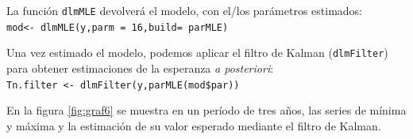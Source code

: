 \documentclass[12pt]{article}\usepackage[]{graphicx}\usepackage[]{color}
\begin{document}
La función \verb|dlmMLE| devolverá el modelo, con el/los parámetros estimados:\\
\verb|mod<- dlmMLE(y,parm = 16,build= parMLE)|

Una vez estimado el modelo, podemos aplicar el filtro de Kalman (\verb|dlmFilter|) para obtener estimaciones de la esperanza \textit{a posteriori}:\\
\verb|Tn.filter <- dlmFilter(y,parMLE(mod$par))|

En la figura \ref{fig:graf6} se muestra en un período de tres años, las series de mínima y máxima y la estimación de su valor esperado mediante el filtro de Kalman.


%
%
% 
\end{document}
